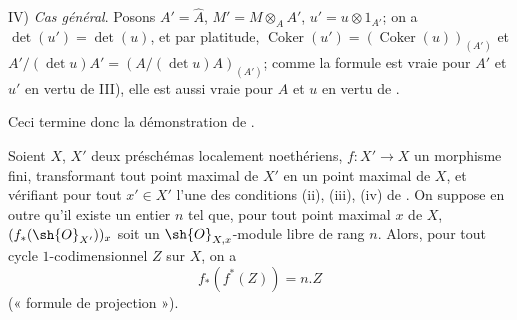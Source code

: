 IV) \emph{Cas général}.
Posons $A'=\widehat{A}$, $M'=M\otimes_AA'$, $u'=u\otimes1_{A'}$;
on a $\det(u')=\det(u)$, et par platitude, $\operatorname{Coker}(u')=(\operatorname{Coker}(u))_{(A')}$ et $A'/(\det u)A'=(A/(\det u)A)_{(A')}$;
comme la formule  est vraie pour $A'$ et $u'$ en vertu de III), elle est aussi vraie pour $A$ et $u$ en vertu de .

Ceci termine donc la démonstration de .

\begin{proposition}[21.10.18]
\label{IV.21.10.18}
Soient $X$, $X'$ deux préschémas localement noethériens, $f:X'\to X$ un morphisme fini, transformant tout point maximal de $X'$ en un point maximal de $X$, et vérifiant pour tout $x'\in X'$ l'une des conditions \textup{(ii), (iii), (iv)} de .
On suppose en outre qu'il existe un entier $n$ tel que, pour tout point maximal $x$ de $X$, $(f_*(\sh{O}_{X'}))_x$ soit un $\sh{O}_{X,x}$-module libre de rang $n$.
Alors, pour tout cycle $1$-codimensionnel $Z$ sur $X$, on a
\[
\label{IV.21.10.18.1}
  f_*(f^*(Z))=n.Z
  \tag{21.10.18.1}
\]
\textup{(« formule de projection »)}.
\end{proposition}

